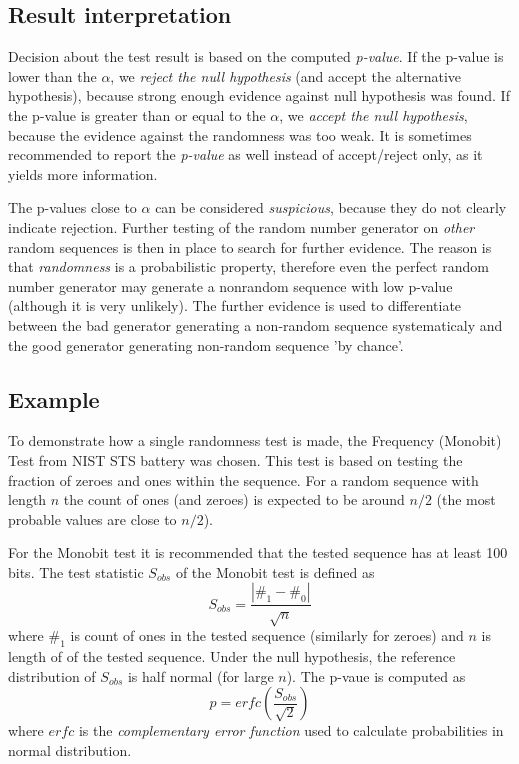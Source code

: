 \documentclass[
  digital,     %
  oneside,     %
  nosansbold,  %
  nocolorbold, %
  nolof,         %
  nolot,         %
]{fithesis4}
\begin{document}
\subsection{Result interpretation} \label{chap:rand-interpretation}

Decision about the test result is based on the computed \emph{p-value}. If the p-value is lower than the $\alpha$, we \emph{reject the null hypothesis} (and accept the alternative hypothesis), because strong enough evidence against null hypothesis was found. If the p-value is greater than or equal to the $\alpha$, we \emph{accept the null hypothesis}, because the evidence against the randomness was too weak. \cite[p. 390]{basic_practice} It is sometimes recommended to report the \emph{p-value} as well instead of accept/reject only, as it yields more information. \cite[p. 90]{tu01_guide}

The p-values close to $\alpha$ can be considered \emph{suspicious}, because they do not clearly indicate rejection. Further testing of the random number generator on \emph{other} random sequences is then in place to search for further evidence. \cite[p. 5]{tu01_paper} The reason is that \emph{randomness} is a probabilistic property, therefore even the perfect random number generator may generate a nonrandom sequence with low p-value (although it is very unlikely). The further evidence is used to differentiate between the bad generator generating a non-random sequence systematicaly and the good generator generating non-random sequence 'by chance'. \cite[p. 90]{tu01_guide}

\subsection{Example} \label{chap:rand-example}

To demonstrate how a single randomness test is made, the Frequency (Monobit) Test from NIST STS battery was chosen. \cite[p. 2-2]{nist_special} This test is based on testing the fraction of zeroes and ones within the sequence. For a random sequence with length $n$ the  count of ones (and zeroes) is expected to be around $n/2$ (the most probable values are close to $n/2$). 

For the Monobit test it is recommended that the tested sequence has at least 100 bits. The test statistic $S_{obs}$ of the Monobit test is defined as \[S_{obs} = \dfrac{|\#_1 - \#_0|}{\sqrt{n}}\] where $\#_1$ is count of ones in the tested sequence (similarly for zeroes) and $n$ is length of of the tested sequence. Under the null hypothesis, the reference distribution of $S_{obs}$ is half normal (for large $n$). The p-vaue is computed as \[ p = erfc(\dfrac{S_{obs}}{\sqrt{2}}) \] where $erfc$ is the \emph{complementary error function} used to calculate probabilities in normal distribution.
\end{document}
